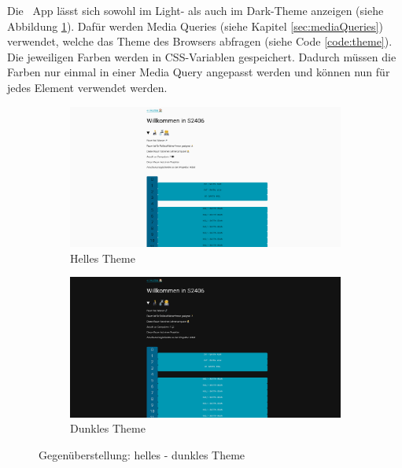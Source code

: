 
Die \ZELIA\ App lässt sich sowohl im Light- als auch im Dark-Theme anzeigen (siehe Abbildung \ref{fig:theme}). 
Dafür werden Media Queries (siehe Kapitel \ref{sec:mediaQueries}) verwendet, welche das Theme des Browsers abfragen (siehe Code \ref{code:theme}). 
Die jeweiligen Farben werden in CSS-Variablen gespeichert. 
Dadurch müssen die Farben nur einmal in einer Media Query angepasst werden und können nun für jedes Element verwendet werden. 

\begin{figure}[H]
    \begin{subfigure}[c]{0.49\textwidth}
        \centering
        \includegraphics[width=\textwidth]{media/ResponsiveDesign/ZeliaDesktop.png}
        \caption{Helles Theme}
    \end{subfigure} \hfill
    \begin{subfigure}[c]{0.49\textwidth}
        \centering
        \includegraphics[width=\textwidth]{media/ResponsiveDesign/ZeliaDesktopDark.png}
        \caption{Dunkles Theme}
    \end{subfigure}
    \caption{Gegenüberstellung: helles - dunkles Theme}
    \label{fig:theme}
\end{figure}

